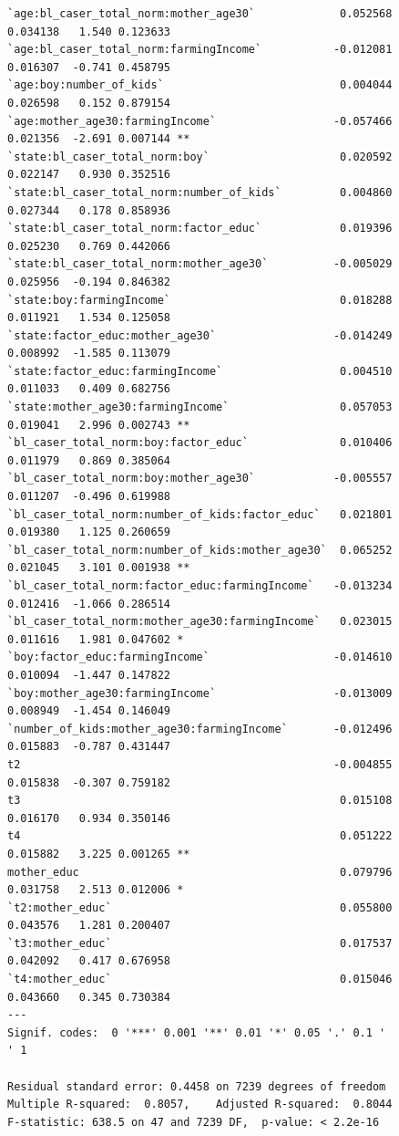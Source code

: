 \documentclass{article}
\begin{document}
\begin{figure}[H]
\begin{lstlisting}[style=RstyleCommentSmall, caption=CATE with Controls selected by LASSO]
`age:bl_caser_total_norm:mother_age30`             0.052568   0.034138   1.540 0.123633    
`age:bl_caser_total_norm:farmingIncome`           -0.012081   0.016307  -0.741 0.458795    
`age:boy:number_of_kids`                           0.004044   0.026598   0.152 0.879154    
`age:mother_age30:farmingIncome`                  -0.057466   0.021356  -2.691 0.007144 ** 
`state:bl_caser_total_norm:boy`                    0.020592   0.022147   0.930 0.352516    
`state:bl_caser_total_norm:number_of_kids`         0.004860   0.027344   0.178 0.858936    
`state:bl_caser_total_norm:factor_educ`            0.019396   0.025230   0.769 0.442066    
`state:bl_caser_total_norm:mother_age30`          -0.005029   0.025956  -0.194 0.846382    
`state:boy:farmingIncome`                          0.018288   0.011921   1.534 0.125058    
`state:factor_educ:mother_age30`                  -0.014249   0.008992  -1.585 0.113079    
`state:factor_educ:farmingIncome`                  0.004510   0.011033   0.409 0.682756    
`state:mother_age30:farmingIncome`                 0.057053   0.019041   2.996 0.002743 ** 
`bl_caser_total_norm:boy:factor_educ`              0.010406   0.011979   0.869 0.385064    
`bl_caser_total_norm:boy:mother_age30`            -0.005557   0.011207  -0.496 0.619988    
`bl_caser_total_norm:number_of_kids:factor_educ`   0.021801   0.019380   1.125 0.260659    
`bl_caser_total_norm:number_of_kids:mother_age30`  0.065252   0.021045   3.101 0.001938 ** 
`bl_caser_total_norm:factor_educ:farmingIncome`   -0.013234   0.012416  -1.066 0.286514    
`bl_caser_total_norm:mother_age30:farmingIncome`   0.023015   0.011616   1.981 0.047602 *  
`boy:factor_educ:farmingIncome`                   -0.014610   0.010094  -1.447 0.147822    
`boy:mother_age30:farmingIncome`                  -0.013009   0.008949  -1.454 0.146049    
`number_of_kids:mother_age30:farmingIncome`       -0.012496   0.015883  -0.787 0.431447    
t2                                                -0.004855   0.015838  -0.307 0.759182    
t3                                                 0.015108   0.016170   0.934 0.350146    
t4                                                 0.051222   0.015882   3.225 0.001265 ** 
mother_educ                                        0.079796   0.031758   2.513 0.012006 *  
`t2:mother_educ`                                   0.055800   0.043576   1.281 0.200407    
`t3:mother_educ`                                   0.017537   0.042092   0.417 0.676958    
`t4:mother_educ`                                   0.015046   0.043660   0.345 0.730384    
---
Signif. codes:  0 '***' 0.001 '**' 0.01 '*' 0.05 '.' 0.1 ' ' 1

Residual standard error: 0.4458 on 7239 degrees of freedom
Multiple R-squared:  0.8057,	Adjusted R-squared:  0.8044 
F-statistic: 638.5 on 47 and 7239 DF,  p-value: < 2.2e-16
\end{lstlisting}
\end{figure}
\end{document}

